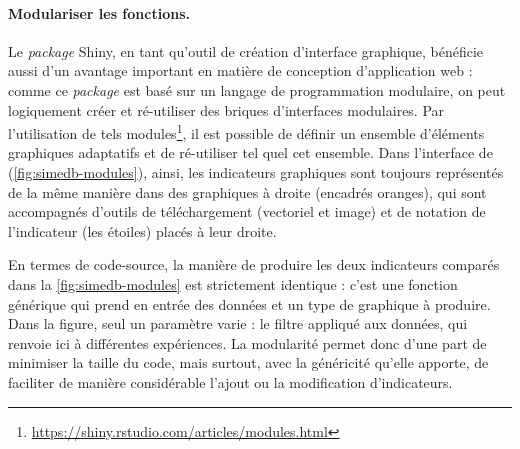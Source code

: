 \paragraph{Modulariser les fonctions.}

Le \textit{package} \textsf{Shiny}, en tant qu'outil de création d'interface graphique, bénéficie aussi d'un avantage important en matière de conception d'application web : comme ce \textit{package} est basé sur un langage de programmation modulaire, on peut logiquement créer et ré-utiliser des \og briques d'interfaces\fg{} modulaires.
Par l'utilisation de tels modules\footnote{
	\href{https://shiny.rstudio.com/articles/modules.html}{https://shiny.rstudio.com/articles/modules.html}
}, il est possible de définir un ensemble d'éléments graphiques adaptatifs et de ré-utiliser tel quel cet ensemble.
Dans l'interface de \simedb{} (\cref{fig:simedb-modules}), ainsi, les indicateurs graphiques sont toujours représentés de la même manière dans des graphiques à droite (encadrés oranges), qui sont accompagnés d'outils de téléchargement (vectoriel et image) et de notation de l'indicateur (les étoiles) placés à leur droite.

En termes de code-source, la manière de produire les deux indicateurs comparés dans la \cref{fig:simedb-modules} est strictement identique : c'est une fonction générique qui prend en entrée des données et un type de graphique à produire.
Dans la figure, seul un paramètre varie : le filtre appliqué aux données, qui renvoie ici à différentes expériences.
La modularité permet donc d'une part de minimiser la taille du code, mais surtout, avec la généricité qu'elle apporte, de faciliter de manière considérable l'ajout ou la modification d'indicateurs.
\clearpage

